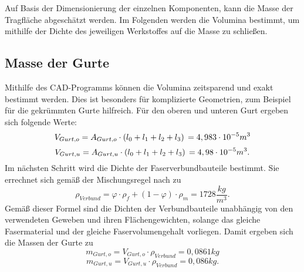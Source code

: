 Auf Basis der Dimensionierung der einzelnen Komponenten, kann die Masse der Tragfläche abgeschätzt werden. Im Folgenden werden die Volumina bestimmt, um mithilfe der Dichte des jeweiligen Werkstoffes auf die Masse zu schließen.
\subsection{Masse der Gurte}
Mithilfe des CAD-Programms können die Volumina zeitsparend und exakt bestimmt werden. Dies ist besonders für komplizierte Geometrien, zum Beispiel für die gekrümmten Gurte hilfreich. Für den oberen und unteren Gurt ergeben sich folgende Werte: 
\begin{equation}
	V_{Gurt,o}=A_{Gurt,o}\cdot \left(l_{0}+l_{1}+l_{2}+l_{3}\right)\\
	=4,983\cdot 10^{-5}m^{3}
\end{equation}
\begin{equation}
	V_{Gurt,u}=A_{Gurt,u}\cdot \left(l_{0}+l_{1}+l_{2}+l_{3}\right)\\
	=4,98\cdot 10^{-5}m^{3}.
\end{equation}
 Im nächsten Schritt wird die Dichte der Faserverbundbauteile bestimmt. Sie errechnet sich gemäß der Mischungsregel nach \cite{item3} zu
\begin{equation}
	\rho_{Verbund}=\varphi\cdot\rho_{f}+\left(1-\varphi\right)\cdot\rho_{m}
	=1728\frac{kg}{m^{3}}.
\end{equation}
Gemäß dieser Formel sind die Dichten der Verbundbauteile unabhängig von den verwendeten Geweben und ihren Flächengewichten, solange das gleiche Fasermaterial und der gleiche Faservolumengehalt vorliegen. Damit ergeben sich die Massen der Gurte zu
\begin{equation}
	m_{Gurt,o}=V_{Gurt,o}\cdot\rho_{Verbund}=0,0861kg
\end{equation}
\begin{equation}
		m_{Gurt,u}=V_{Gurt,u}\cdot\rho_{Verbund}=0,086kg .
\end{equation}

